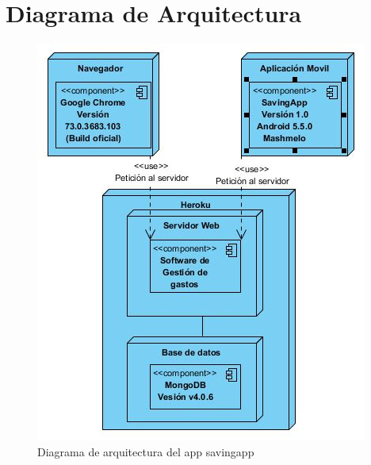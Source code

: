 \chapter{Diagrama de Arquitectura}

\label{intro}

\begin{figure}
\centering
\includegraphics[scale=1]{chapters/img/DiagramaArquitectura}
\caption{Diagrama de arquitectura del app savingapp}
\end{figure}

\cleardoublepage